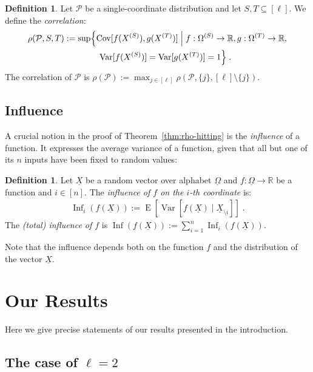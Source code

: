 \documentclass{daj}
\newcommand{\1}{\mathbbm{1}}
\theoremstyle{plain}
\theoremstyle{definition}
\newtheorem{definition}[theorem]{Definition}
\DeclareMathOperator*{\EE}{E}
\DeclareMathOperator*{\Var}{Var}
\DeclareMathOperator*{\Cov}{Cov}
\DeclareMathOperator{\Inf}{Inf}
\begin{document}
\begin{definition}\label{def:correlation}
Let $\mathcal{P}$ be a single-coordinate distribution
and let $S, T \subseteq [\ell]$. We define the \emph{correlation}:
\begin{align*}
\rho(\mathcal{P}, S, T) &:=
\sup \Bigl\{ \Cov[f(X^{(S)}), g(X^{(T)})] \Bigm| 
f: \Omega^{(S)} \to \mathbb{R}, 
g: \Omega^{(T)} \to \mathbb{R}, \\
&\qquad\qquad
\Var[f(X^{(S)})] = \Var[g(X^{(T)})] = 1 
\Bigr\} \; .
\end{align*}
The correlation of $\mathcal{P}$ is
$\rho(\mathcal{P}) := \max_{j \in [\ell]} 
\rho\left(\mathcal{P}, \{j\}, [\ell]\setminus\{j\}\right)$.
\end{definition}

\subsection{Influence}

A crucial notion in the proof of Theorem~\ref{thm:rho-hitting} is
the \emph{influence} of a function. It expresses the average variance of a 
function, 
given that all but one of its $n$ inputs have been fixed to random values:
\begin{definition}
Let $\underline{X}$ be a random vector over alphabet $\underline{\Omega}$
and $f: \underline{\Omega} \to \mathbb{R}$ be a function
and $i \in [n]$. The \emph{influence of $f$ on the $i$-th coordinate} is:
\begin{align*}
  \Inf_i(f(\underline{X})) := \EE \left[ \Var\left[ f(\underline{X}) 
  \mid \underline{X}_{\setminus i} \right] \right]
  \; .
\end{align*}
The \emph{(total) influence of $f$} is 
$\Inf(f(\underline{X})) := \sum_{i=1}^n \Inf_i(f(\underline{X}))$.
\end{definition}
Note that the influence depends both on the function $f$ and
the distribution of the vector $\underline{X}$.

\section{Our Results}
\label{sec:results}

Here we give precise statements of our results presented in the introduction.

\subsection{The case of 
\texorpdfstring{$\ell = 2$}{l = 2}}
\end{document}
